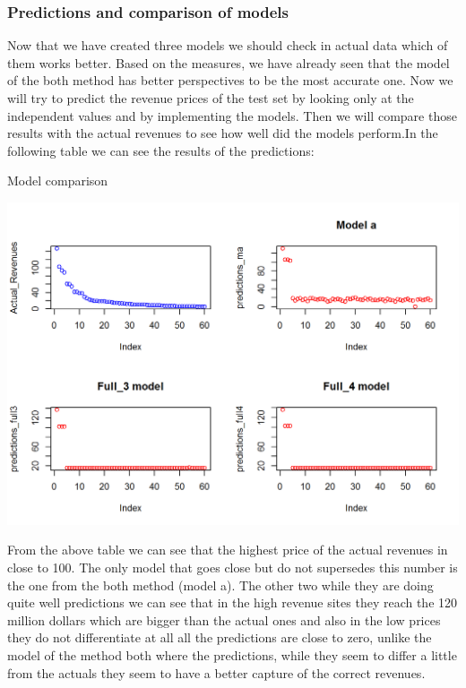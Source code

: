 \documentclass{book}
\begin{document}
\subsubsection{Predictions and comparison of models}
Now that we have created three models we should check in actual data which of them works better. Based on the measures, we have already seen that the model of the both method has better perspectives to be the most accurate one. Now we will try to predict the revenue prices of the test set by looking only at the independent values and by implementing the models. Then we will compare those results with the actual revenues to see how well did the models perform.In the following table we can see the results of the predictions:
\begin{table}[H]
\centering
\caption{Model comparison}
\begin{center}
\includegraphics[scale=0.6]{../R/photos/85_pred_mod.png}    \\
\end{center}
\end{table}
From the above table we can see that the highest price of the actual revenues in close to 100. The only model that goes close but do not supersedes this number is the one from the both method (model a). The other two while they are doing quite well predictions we can see that in the high revenue sites they reach the 120 million dollars which are bigger than the actual ones and also in the low prices they do not differentiate at all all the predictions are close to zero, unlike the model of the method both where the predictions, while they seem to differ a little from the actuals they seem to have a better capture of the correct revenues.\\
\end{document}
